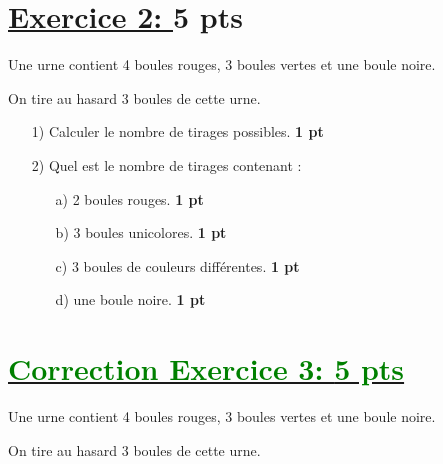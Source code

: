 \documentclass[12pt]{article}
\begin{document}
\section*{\underline{Exercice 2: }\textbf{5 pts}}
Une urne contient 4 boules rouges, 3 boules vertes et une boule noire.

On tire au hasard 3 boules de cette urne.

\begin{itemize}
\item[1)] Calculer le nombre de tirages possibles. \textbf{1 pt}
\item[2)] Quel est le nombre de tirages contenant :
\begin{itemize}
\item[a)] 2 boules rouges. \textbf{1 pt}
\item[b)] 3 boules unicolores. \textbf{1 pt}
\item[c)] 3 boules de couleurs différentes. \textbf{1 pt}
\item[d)] une boule noire. \textbf{1 pt}
\end{itemize}
\end{itemize}
\section*{\underline{\textcolor{green}{Correction Exercice 3: \textbf{5 pts}}}}
Une urne contient 4 boules rouges, 3 boules vertes et une boule noire.

On tire au hasard 3 boules de cette urne.
\end{document}
